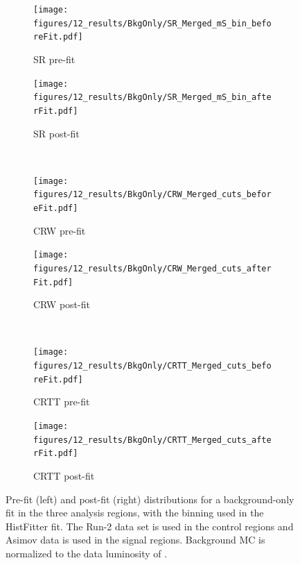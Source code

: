 \begin{figure}[!tb]
  \centering
  \begin{subfigure}{0.45\textwidth}
    \texttt{[image: figures/12\_results/BkgOnly/SR\_Merged\_mS\_bin\_beforeFit.pdf]}
    \caption{\merged SR pre-fit}\label{fig:prefit_merged_SR_bkgonly}
  \end{subfigure} \hspace{1em}
  \begin{subfigure}{0.45\textwidth}
    \texttt{[image: figures/12\_results/BkgOnly/SR\_Merged\_mS\_bin\_afterFit.pdf]}
    \caption{\merged SR post-fit}\label{fig:postfit_merged_SR_bkgonly}
  \end{subfigure} \\ \vspace{1em}
  \begin{subfigure}{0.45\textwidth}
    \texttt{[image: figures/12\_results/BkgOnly/CRW\_Merged\_cuts\_beforeFit.pdf]}
    \caption{\merged CRW pre-fit}\label{fig:prefit_merged_CRW_bkgonly}
  \end{subfigure} \hspace{1em}
  \begin{subfigure}{0.45\textwidth}
    \texttt{[image: figures/12\_results/BkgOnly/CRW\_Merged\_cuts\_afterFit.pdf]}
    \caption{\merged CRW post-fit}\label{fig:postfit_merged_CRW_bkgonly}
  \end{subfigure} \\ \vspace{1em}
    \begin{subfigure}{0.45\textwidth}
    \texttt{[image: figures/12\_results/BkgOnly/CRTT\_Merged\_cuts\_beforeFit.pdf]}
    \caption{\merged CRTT pre-fit}\label{fig:prefit_merged_CRTT_bkgonly}
  \end{subfigure} \hspace{1em}
  \begin{subfigure}{0.45\textwidth}
    \texttt{[image: figures/12\_results/BkgOnly/CRTT\_Merged\_cuts\_afterFit.pdf]}
    \caption{\merged CRTT post-fit}\label{fig:postfit_merged_CRTT_bkgonly}
  \end{subfigure}
  \caption[Pre- and post-fit distributions in \merged analysis regions for background-only fit]{Pre-fit (left) and post-fit (right) distributions for a background-only fit in the three \merged analysis regions, with the binning used in the HistFitter fit. The Run-2 data set is used in the control regions and Asimov data is used in the signal regions. Background MC is normalized to the data luminosity of \Lumi.}
  \label{fig:pre_post_merged_bkgonly}
\end{figure}

